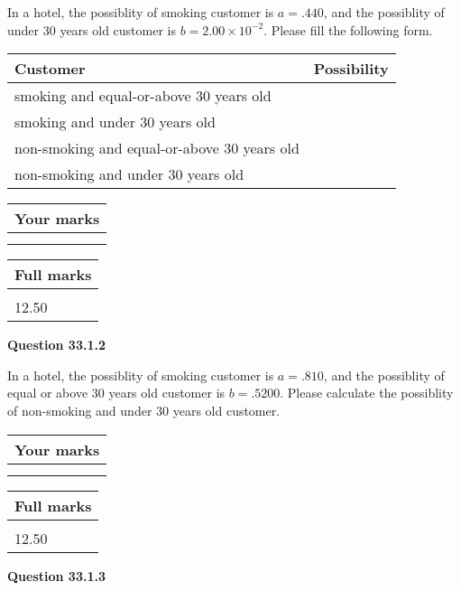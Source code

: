 \documentclass[12pt]{article}
\begin{document}
  
In a hotel, the possiblity of  %
smoking customer is
$a =  %
.440$, and the possiblity of  %
 under 30 years old customer is $ b =  %
2.00 \times 10^{-2}$.
Please fill the following form.
 
\noindent
\begin{tabular}{|l|l|}
\hline
Customer & Possibility \\
\hline
smoking  and   %
equal-or-above 30 years old  & \\
\hline
smoking  and   %
under 30 years old & \\
\hline
 non-smoking and   %
equal-or-above 30 years old  & \\
\hline
 non-smoking and  %
under 30 years old & \\
\hline
\end{tabular}
 
 
 

 

 
\vspace{0.3in}
  
\vspace{0.2in}
  
         \begin{tabular}{|l|}
\hline
 Your marks  \\
\hline
 \\ 
 \\ 
\hline
\end{tabular}
\hspace{0.05in} \begin{tabular}{|l|}
\hline
 Full marks  \\
\hline
 \\ 
12.50 \\
\hline
\end{tabular}
{\textbf{\Large{Question
33.1.2 
}}}
  
  
In a hotel, the possiblity of  %
smoking customer is
$a =  %
.810$, and the possiblity of  %
equal or above 30 years old customer is $ b =  %
.5200$.
Please calculate the possiblity of  %
 non-smoking and  %
under 30 years old customer.
 

 

 
\vspace{0.3in}
  
\vspace{0.2in}
  
         \begin{tabular}{|l|}
\hline
 Your marks  \\
\hline
 \\ 
 \\ 
\hline
\end{tabular}
\hspace{0.05in} \begin{tabular}{|l|}
\hline
 Full marks  \\
\hline
 \\ 
12.50 \\
\hline
\end{tabular}
{\textbf{\Large{Question
33.1.3 
}}}
  
\end{document}
